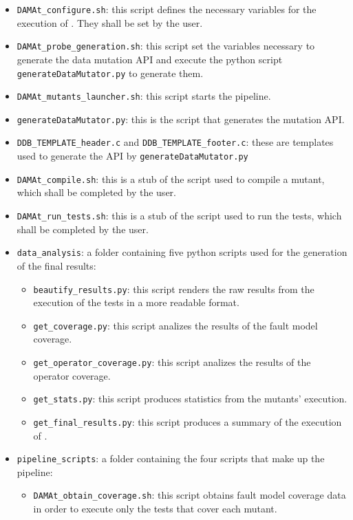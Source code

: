 \begin{itemize}
	\item \texttt{DAMAt\_configure.sh}: this script defines the necessary variables for the execution of \DAMA. They shall be set by the user.
	\item \texttt{DAMAt\_probe\_generation.sh}: this script set the variables necessary to generate the data mutation API and execute the python script \texttt{generateDataMutator.py} to generate them.
	\item \texttt{DAMAt\_mutants\_launcher.sh}: this script starts the \DAMA pipeline.
	\item \texttt{generateDataMutator.py}: this is the script that generates the \DAMA mutation API.
	\item \texttt{DDB\_TEMPLATE\_header.c} and \texttt{DDB\_TEMPLATE\_footer.c}: these are templates used to generate the \DAMA API by \texttt{generateDataMutator.py}
	\item \texttt{DAMAt\_compile.sh}: this is a stub of the script used to compile a mutant, which shall be completed by the user.
	\item \texttt{DAMAt\_run\_tests.sh}: this is a stub of the script used to run the tests, which shall be completed by the user.
	\item \texttt{data\_analysis}: a folder containing five python scripts used for the generation of the final results:
	\begin{itemize}
	  \item \texttt{beautify\_results.py}: this script renders the raw results from the execution of the tests in a more readable format.
	  \item \texttt{get\_coverage.py}: this script analizes the results of the fault model coverage.
	  \item \texttt{get\_operator\_coverage.py}: this script analizes the results of the operator coverage.
	  \item \texttt{get\_stats.py}: this script produces statistics from the mutants' execution.
		\item \texttt{get\_final\_results.py}: this script produces a summary of the execution of \DAMA.
	\end{itemize}
	\item \texttt{pipeline\_scripts}: a folder containing the four scripts that make up the \DAMA pipeline:
	\begin{itemize}
		\item \texttt{DAMAt\_obtain\_coverage.sh}: this script obtains fault model coverage data in order to execute only the tests that cover each mutant.

\end{itemize}
\end{itemize}
